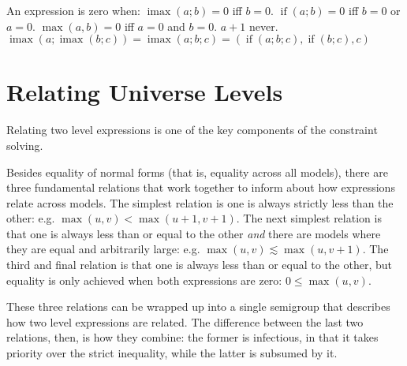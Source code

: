 \documentclass[11pt, twoside, reqno]{book}
\DeclareMathOperator{\imax}{imax}
\DeclareMathOperator{\ifop}{if}
\begin{document}
An expression is zero when:
\(\imax(a; b) = 0\) iff \(b = 0\).
\(\ifop(a; b) = 0\) iff \(b = 0\) or \(a = 0\).
\(\max(a, b) = 0\) iff \(a = 0\) and \(b = 0\).
\(a+1\) never.
\(\imax(a; \imax(b; c)) = \imax(a; b; c) = (\ifop(a; b; c), \ifop(b; c), c)\)



%
%


\section{Relating Universe Levels}
\label{rel-uni-lvl}

Relating two level expressions is one of the key components of the constraint solving.

Besides equality of normal forms (that is, equality across all models), there are three fundamental relations that work together to inform about how expressions relate across models.
The simplest relation is one is always strictly less than the other: e.g. \(\max(u,v) < \max(u+1,v+1)\).
The next simplest relation is that one is always less than or equal to the other \emph{and} there are models where they are equal and arbitrarily large: e.g. \(\max(u,v) \lesssim \max(u,v+1)\).
The third and final relation is that one is always less than or equal to the other, but equality is only achieved when both expressions are zero: \(0 \leqslant \max(u,v)\).

These three relations can be wrapped up into a single semigroup that describes how two level expressions are related.
The difference between the last two relations, then, is how they combine: the former is infectious, in that it takes priority over the strict inequality, while the latter is subsumed by it.
\end{document}
